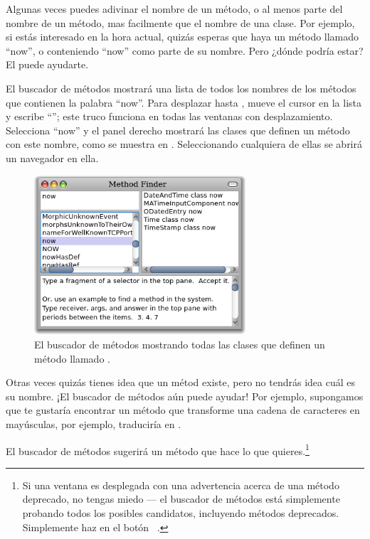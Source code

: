 \documentclass[a4paper,10pt,twoside]{book}
\begin{document}
Algunas veces puedes adivinar el nombre de un m\'etodo, o al menos parte del nombre de un m\'etodo, mas facilmente que el nombre de una clase. Por ejemplo, si est\'as interesado en la hora actual, quiz\'as esperas que haya un m\'etodo llamado ``now'', o conteniendo ``now'' como parte de su nombre. Pero ¿d\'onde podr\'ia estar?
El  puede ayudarte.

El buscador de m\'etodos mostrar\'a una lista de todos los nombres de los m\'etodos que contienen la palabra ``now''.
Para desplazar hasta , mueve el cursor en la lista y escribe ``''; este truco funciona en todas las ventanas con desplazamiento. Selecciona ``now'' y el panel derecho mostrar\'a las clases que definen un m\'etodo con este nombre, como se muestra en . Seleccionando cualquiera de ellas se abrir\'a un navegador en ella.

\begin{figure}[hbt]
\centerline {\includegraphics[width=0.7\textwidth]{methodFinder-now}}
\caption{El buscador de m\'etodos mostrando todas las clases que definen un m\'etodo llamado .
}
\end{figure}

Otras veces quiz\'as tienes idea que un m\'etod existe, pero no tendr\'as idea cu\'al es su nombre.
¡El buscador de m\'etodos a\'un puede ayudar! Por ejemplo, supongamos que te gustar\'ia encontrar un m\'etodo que transforme una cadena de caracteres en may\'usculas, por ejemplo, traducir\'ia  en .

\noindent
El buscador de m\'etodos sugerir\'a un m\'etodo que hace lo que quieres.\footnote{Si una ventana es desplegada con una advertencia acerca de una m\'etodo deprecado, no tengas miedo --- el buscador de m\'etodos est\'a simplemente probando todos los posibles candidatos, incluyendo m\'etodos deprecados. Simplemente haz \click en el bot\'on ~.}
\end{document}
